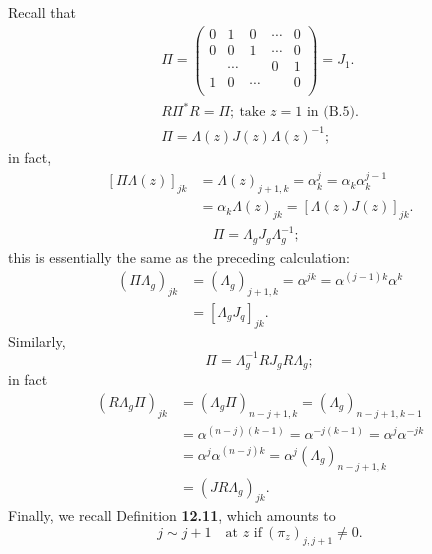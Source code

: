 \documentclass{surv-l}
\theoremstyle{plain}
\theoremstyle{definition}
\numberwithin{equation}{chapter}
\begin{document}
{Recall that
\begin{align}\label{eqb.13}
\Pi=\left(
      \begin{array}{ccccc}
        0 & 1 & 0 & \cdots & 0 \\
        0 & 0 & 1 & \cdots & 0 \\
          & \cdots &  & 0 & 1 \\
        1 & 0 & \cdots &  & 0 \\
      \end{array}
    \right) = J_{1}.\nonumber\\
R\Pi^{*}R=\Pi;\ \text{take $z=1$ in (B.5)}.\\
\Pi=\Lambda(z)J(z)\Lambda(z)^{-1};
\end{align}
in fact,
\begin{align}\label{eqB.15}
[\Pi\Lambda(z)]_{jk} & = \Lambda(z)_{j+1,k} = \alpha_{k}^{j} = \alpha_{k}\alpha_{k}^{j-1}\nonumber\\
& = \alpha_{k}\Lambda(z)_{j k}=[\Lambda(z)J(z)]_{j k}.\nonumber\\
&\quad \Pi=\Lambda_{g}J_{g}\Lambda_{g}^{-1};
\end{align}
this is essentially the same as the preceding calculation:
\begin{align*}
(\Pi\Lambda_{g})_{jk} & = (\Lambda_{g})_{j+1,k}=\alpha^{j k}=\alpha^{(j-1)k}\alpha^{k}\\
& = [\Lambda_{g}J_{q}]_{j k}.
\end{align*}
Similarly,
\begin{equation}\label{eqB.16}
\Pi=\Lambda_{g}^{-1}RJ_{g}R\Lambda_{g};
\end{equation}
in fact
\begin{align*}
(R\Lambda_{g}\Pi)_{jk} & =(\Lambda_{g}\Pi)_{n-j+1,k}=(\Lambda_{g})_{n-j+1,k-1}\\
& = \alpha^{(n-j)(k-1)} = \alpha^{-j(k-1)}=\alpha^{j}\alpha^{-j k}\\
& =\alpha^{j}\alpha^{(n-j)k} = \alpha^{j}(\Lambda_{g})_{n-j+1,k}\\
& =(JR\Lambda_{g})_{jk}.
\end{align*}
Finally, we recall Definition \textbf{12.11}, which amounts to
\begin{equation}\label{eqB.17}
j \sim j+1\quad \text{at $z$ if}\ (\pi_{z})_{j,j+1}\neq 0.
\end{equation}
}
\end{document}
